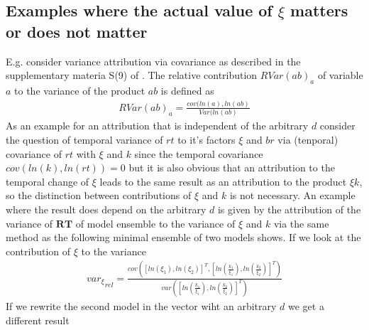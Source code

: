 \documentclass[journal abbreviation, manuscript]{copernicus}
\theoremstyle{definition}
\newcommand{\RT}{\mathbf{RT}}
\begin{document}
\subsection{Examples where the actual value of $\xi$ matters or does not matter}     %
\label{xi_examples}
E.g. consider variance attribution via covariance as described in the supplementary materia S(9) of \citep{Zhou2018JOC}.
The relative contribution $RVar(a b)_a$ of variable $a$ to the variance of the product $a b$ is defined as 
\begin{align}
  \label{covln}
  RVar(a b)_a = \frac{cov(ln(a),ln(a b)}{Var(ln(a b)} 
\end{align}
As an example for an attribution that is independent of the arbitrary $d$
consider the question of temporal variance of $rt$ to it's factors $\xi$ and
$br$ via (tenporal) covariance of $rt$ with $\xi$ and $k$ since the temporal
covariance $ cov(ln(k),ln(rt))=0 $ but it is also obvious that an attribution to
the temporal change of $\xi$ leads to the same result as an attribution to the
product $\xi k$, so the distinction between contributions of $\xi$ and $k$ is
not necessary.  
An example where the result does
depend on the arbitrary $d$ is given by the attribution of the variance of $\RT$
of model ensemble to the variance of $\xi$ and $k$ via the same method as the
following minimal ensemble of two models shows. If we look at the contribution
of $\xi$ to the variance
\begin{align}
{var_{\xi}}_{rel} = \frac{
  cov([ln(\xi_1),ln(\xi_2)]^T,[ln(\frac{k_1}{\xi_1}),ln(\frac{k_2}{\xi_2})]^T)
}{
  var([ln(\frac{k_1}{\xi_1}),ln(\frac{k_2}{\xi_2})]^T)
}
\end{align}
If we rewrite the second model in the vector wiht an arbitrary $d$ we get a different result



\noappendix       %

\end{document}
